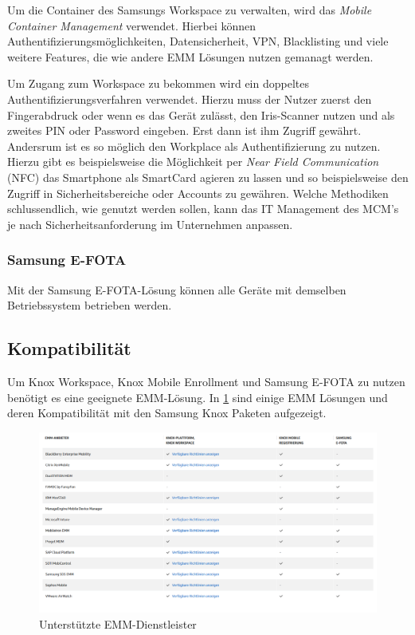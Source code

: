 Um die Container des Samsungs Workspace zu verwalten, wird das \textit{Mobile Container Management} verwendet. Hierbei können Authentifizierungsmöglichkeiten, Datensicherheit,  VPN, Blacklisting und viele weitere Features, die wie andere EMM Lösungen nutzen gemanagt werden.

Um Zugang zum Workspace zu bekommen wird ein doppeltes Authentifizierungsverfahren verwendet. Hierzu muss der Nutzer zuerst den Fingerabdruck oder wenn es das Gerät zulässt, den Iris-Scanner nutzen und als zweites PIN oder Password eingeben. Erst dann ist ihm Zugriff gewährt.
Andersrum ist es so möglich den Workplace als Authentifizierung zu nutzen. Hierzu gibt es beispielsweise die Möglichkeit per \textit{Near Field Communication} (NFC) das Smartphone als SmartCard agieren zu lassen und so beispielsweise den Zugriff in Sicherheitsbereiche oder Accounts zu gewähren.
Welche Methodiken schlussendlich, wie genutzt werden sollen, kann das IT Management des MCM's je nach Sicherheitsanforderung im Unternehmen anpassen.

\subsubsection{Samsung E-FOTA}
Mit der Samsung E-FOTA-Lösung können alle Geräte mit demselben Betriebssystem betrieben werden.


\subsection{Kompatibilität}
Um Knox Workspace, Knox Mobile Enrollment und Samsung E-FOTA zu nutzen benötigt es eine geeignete EMM-Lösung. In \cref{fig:SamKno3} sind einige EMM Lösungen und deren Kompatibilität mit den Samsung Knox Paketen aufgezeigt.
\begin{figure}[hbt]
\centering
\includegraphics[width=1\textwidth]{Bilder/sk_3}
\caption{Unterstützte EMM-Dienstleister}\label{fig:SamKno3}
\end{figure}

